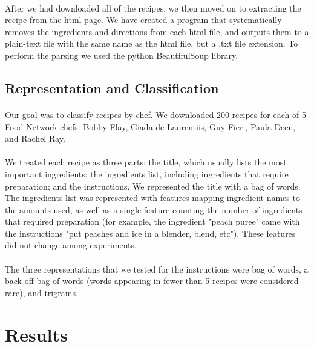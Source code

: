 \documentclass[paper=a4, fontsize=11pt]{scrartcl} %
\begin{document}
\paragraph{}
After we had downloaded all of the recipes, we then moved on to extracting the recipe from the html page.  We have created a program that systematically removes the ingredients and directions from each html file, and outputs them to a plain-text file with the same name as the html file, but a .txt file extension.  To perform the parsing we used the python BeautifulSoup library.

\subsection{Representation and Classification}

\paragraph{}
Our goal was to classify recipes by chef.  
We downloaded 200 recipes for each of 5 Food Network chefs: Bobby Flay, Giada de Laurentiis, Guy Fieri, Paula Deen, and Rachel Ray.  

\paragraph{}
We treated each recipe as three parts: the title, which usually lists the most important ingredients; the ingredients list, including ingredients that require preparation; and the instructions.  We represented the title with a bag of words.  The ingredients list was represented with features mapping ingredient names to the amounts used, as well as a single feature counting the number of ingredients that required preparation (for example, the ingredient "peach puree" came with the instructions "put peaches and ice in a blender, blend, etc").  These features did not change among experiments.

\paragraph{}
The three representations that we tested for the instructions were bag of words, a back-off bag of words (words appearing in fewer than 5 recipes were considered rare), and trigrams.  

\section{Results}
\end{document}
